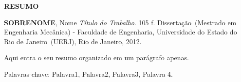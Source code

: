 \begin{center}
\textbf{RESUMO}
\end{center}

%
%

$\!$\\

\hspace{-1.3cm}\textbf{SOBRENOME}, Nome \textit{Título do Trabalho}. 105 f. Dissertação~(Mestrado em Engenharia Mecânica) - Faculdade de Engenharia, Universidade do Estado do Rio de Janeiro~(UERJ), Rio de Janeiro, 2012.

\vspace{.2cm}

Aqui entra o seu resumo organizado em um parágrafo apenas.

\vspace{1cm}

\hspace{-1.3cm}Palavras-chave: Palavra1, Palavra2, Palavra3, Palavra 4.